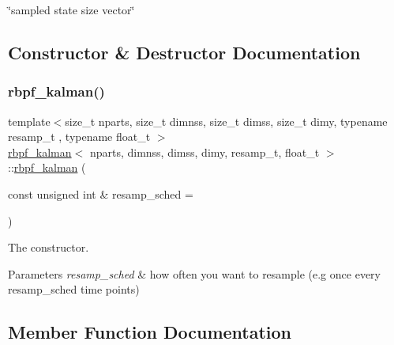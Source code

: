 \char`\"{}sampled state size vector\char`\"{} 

\subsection{Constructor \& Destructor Documentation}
\mbox{\label{classrbpf__kalman_a1e128a8dce0874251839b88d1f3cf123}} 
\subsubsection{\texorpdfstring{rbpf\+\_\+kalman()}{rbpf\_kalman()}}
{\footnotesize\ttfamily template$<$size\+\_\+t nparts, size\+\_\+t dimnss, size\+\_\+t dimss, size\+\_\+t dimy, typename resamp\+\_\+t , typename float\+\_\+t $>$ \\
\hyperlink{classrbpf__kalman}{rbpf\+\_\+kalman}$<$ nparts, dimnss, dimss, dimy, resamp\+\_\+t, float\+\_\+t $>$\+::\hyperlink{classrbpf__kalman}{rbpf\+\_\+kalman} (\begin{DoxyParamCaption}\item[{const unsigned int \&}]{resamp\+\_\+sched = {} }\end{DoxyParamCaption})}



The constructor. 


\begin{DoxyParams}{Parameters}
{\em resamp\+\_\+sched} & how often you want to resample (e.\+g once every resamp\+\_\+sched time points) \\
\hline
\end{DoxyParams}


\subsection{Member Function Documentation}
\mbox{\label{classrbpf__kalman_aad12bf3b1966d7201922770b90429bf0}} 
